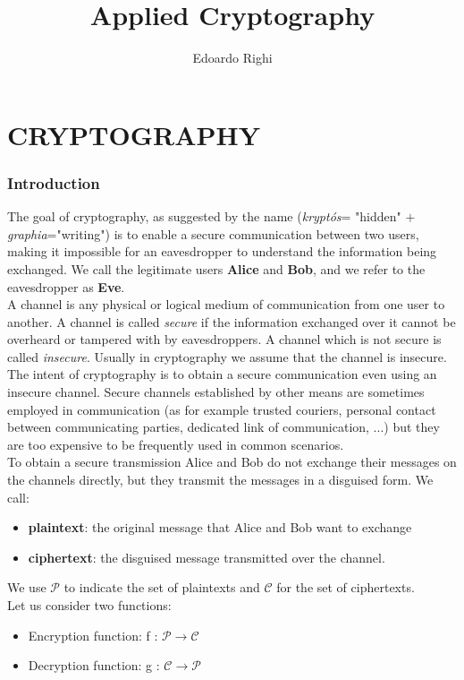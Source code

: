 \documentclass[a4paper, 10pt, titlepage]{article}
\begin{document}
	\title{Applied Cryptography}
	\author{Edoardo Righi}
	\maketitle
	\thispagestyle{empty}
	\tableofcontents
	\newpage
	\part{CRYPTOGRAPHY}
	\newpage
	\section{Introduction}
	The goal of cryptography, as suggested by the name (\textit{kryptós}= "hidden" $+$ \textit{graphia}="writing") is to enable a secure communication between two users, making it impossible for an eavesdropper to understand the information being exchanged. We call the legitimate users \textbf{Alice} and \textbf{Bob}, and we refer to the eavesdropper as \textbf{Eve}. \\
	A channel is any physical or logical medium of communication from one user to another. A channel is called \textit{secure} if the information exchanged over it cannot be overheard or tampered with by eavesdroppers. A channel which is not secure is called \textit{insecure}. Usually in cryptography we assume that the channel is insecure. The intent of cryptography is to obtain a secure communication even using an insecure channel. Secure channels established by other means are sometimes employed in communication (as for example trusted couriers, personal contact between communicating parties, dedicated link of communication, ...) but they are too expensive to be frequently used in common scenarios. \\
	To obtain a secure transmission Alice and Bob do not exchange their messages on the channels directly, but they transmit the messages in a disguised form. We call:
	\begin{itemize}
	\item \textbf{plaintext}: the original message that Alice and Bob want to
exchange
\item \textbf{ciphertext}: the disguised message transmitted over the channel.
	\end{itemize}
We use $\mathcal{P}$ to indicate the set of plaintexts and $\mathcal{C}$ for the set of ciphertexts. \medskip \\
Let us consider two functions:
\begin{itemize}
\item Encryption function: f : $\mathcal{P} \rightarrow \mathcal{C}$
\item Decryption function: g : $\mathcal{C} \rightarrow \mathcal{P}$
\end{itemize}
\end{document}
